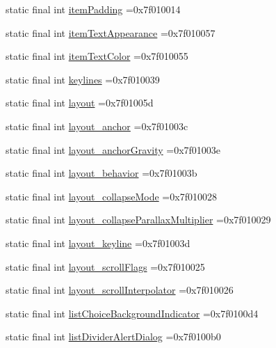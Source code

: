 \begin{DoxyCompactItemize}
\item 
static final int \hyperlink{classcheck_1_1test_1_1_r_1_1attr_ab2727a6858d6de3d85c2cb2ca13fde08}{item\+Padding} =0x7f010014
\item 
static final int \hyperlink{classcheck_1_1test_1_1_r_1_1attr_a809705d403dcd9aea9a6cb585edd2db3}{item\+Text\+Appearance} =0x7f010057
\item 
static final int \hyperlink{classcheck_1_1test_1_1_r_1_1attr_ae472660038cfb76060dc9b0f251d8d58}{item\+Text\+Color} =0x7f010055
\item 
static final int \hyperlink{classcheck_1_1test_1_1_r_1_1attr_a3ce856b9d1ee5098ec18015926299c1b}{keylines} =0x7f010039
\item 
static final int \hyperlink{classcheck_1_1test_1_1_r_1_1attr_ad35b4cdae10aba976d5133cc5f47e7af}{layout} =0x7f01005d
\item 
static final int \hyperlink{classcheck_1_1test_1_1_r_1_1attr_a513151f8e3655d179db3b9e843eb2099}{layout\+\_\+anchor} =0x7f01003c
\item 
static final int \hyperlink{classcheck_1_1test_1_1_r_1_1attr_af02d49a287ddff50432bf16e0579f4b0}{layout\+\_\+anchor\+Gravity} =0x7f01003e
\item 
static final int \hyperlink{classcheck_1_1test_1_1_r_1_1attr_aa93dbcd477d2bd01b579801fd1bff846}{layout\+\_\+behavior} =0x7f01003b
\item 
static final int \hyperlink{classcheck_1_1test_1_1_r_1_1attr_a88021fcc3cb9014c95731b525c8c7a13}{layout\+\_\+collapse\+Mode} =0x7f010028
\item 
static final int \hyperlink{classcheck_1_1test_1_1_r_1_1attr_a5528272c37ed600e150a691896da50c8}{layout\+\_\+collapse\+Parallax\+Multiplier} =0x7f010029
\item 
static final int \hyperlink{classcheck_1_1test_1_1_r_1_1attr_a4471bf945a7ff92386e6b03e2f974b7d}{layout\+\_\+keyline} =0x7f01003d
\item 
static final int \hyperlink{classcheck_1_1test_1_1_r_1_1attr_a4cd51333f9028ba7b1d600246194d391}{layout\+\_\+scroll\+Flags} =0x7f010025
\item 
static final int \hyperlink{classcheck_1_1test_1_1_r_1_1attr_adac9c4882ddd233e198cfa1a87d563d1}{layout\+\_\+scroll\+Interpolator} =0x7f010026
\item 
static final int \hyperlink{classcheck_1_1test_1_1_r_1_1attr_ae62397dfd4fd28583456ecf25a611d85}{list\+Choice\+Background\+Indicator} =0x7f0100d4
\item 
static final int \hyperlink{classcheck_1_1test_1_1_r_1_1attr_afac1cbbb1b94904e17111d40e56cd3dd}{list\+Divider\+Alert\+Dialog} =0x7f0100b0

\end{DoxyCompactItemize}
